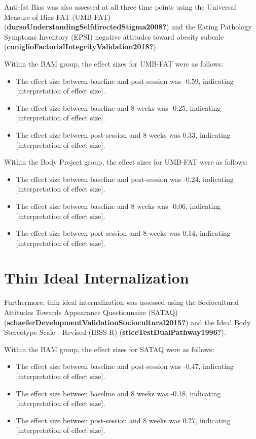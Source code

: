 \documentclass[
  letterpaper,
  DIV=11,
  numbers=noendperiod]{scrreprt}
\begin{document}
Anti-fat Bias was also assessed at all three time points using the
Universal Measure of Bias-FAT
(UMB-FAT)(\textbf{dursoUnderstandingSelfdirectedStigma2008?}) and the
Eating Pathology Symptoms Inventory (EPSI) negative attitudes toward
obesity subcale (\textbf{coniglioFactorialIntegrityValidation2018?}).

Within the BAM group, the effect sizes for UMB-FAT were as follows:

\begin{itemize}
\item
  The effect size between baseline and post-session was -0.59,
  indicating {[}interpretation of effect size{]}.
\item
  The effect size between baseline and 8 weeks was -0.25, indicating
  {[}interpretation of effect size{]}.
\item
  The effect size between post-session and 8 weeks was 0.33, indicating
  {[}interpretation of effect size{]}.
\end{itemize}

Within the Body Project group, the effect sizes for UMB-FAT were as
follows:

\begin{itemize}
\item
  The effect size between baseline and post-session was -0.24,
  indicating {[}interpretation of effect size{]}.
\item
  The effect size between baseline and 8 weeks was -0.06, indicating
  {[}interpretation of effect size{]}.
\item
  The effect size between post-session and 8 weeks was 0.14, indicating
  {[}interpretation of effect size{]}.
\end{itemize}

\hypertarget{thin-ideal-internalization}{%
\section{Thin Ideal Internalization}\label{thin-ideal-internalization}}

Furthermore, thin ideal internalization was assessed using the
Sociocultural Attitudes Towards Appearance Questionnaire (SATAQ)
(\textbf{schaeferDevelopmentValidationSociocultural2015?}) and the Ideal
Body Stereotype Scale - Revised (IBSS-R)
(\textbf{sticeTestDualPathway1996?}).

Within the BAM group, the effect sizes for SATAQ were as follows:

\begin{itemize}
\item
  The effect size between baseline and post-session was -0.47,
  indicating {[}interpretation of effect size{]}.
\item
  The effect size between baseline and 8 weeks was -0.18, indicating
  {[}interpretation of effect size{]}.
\item
  The effect size between post-session and 8 weeks was 0.27, indicating
  {[}interpretation of effect size{]}.
\end{itemize}
\end{document}
